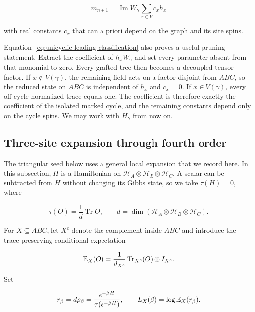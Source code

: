 \begin{equation}
 m_{n+1}=\operatorname{Im}W_\gamma\sum_{x\in V}c_xh_x
 \label{eq:unicyclic-leading-classification}
\end{equation}

with real constants $c_x$ that can a priori depend on the graph and its site
spins.

Equation~\eqref{eq:unicyclic-leading-classification} also proves a useful
pruning statement.  Extract the coefficient of $h_xW_\gamma$ and set every
parameter absent from that monomial to zero.  Every grafted tree then becomes
a decoupled tensor factor.  If $x\notin V(\gamma)$, the remaining field acts
on a factor disjoint from $ABC$, so the reduced state on $ABC$ is independent
of $h_x$ and $c_x=0$.  If $x\in V(\gamma)$, every off-cycle normalized trace
equals one.  The coefficient is therefore exactly the coefficient of the
isolated marked cycle, and the remaining constants depend only on the cycle
spins.  We may work with $H_\gamma$ from now on.

\subsection{Three-site expansion through fourth order}
\label{sec:three-site-expansion}

The triangular seed below uses a general local expansion that we record here.
In this subsection, $H$ is a Hamiltonian on
$\mathcal H_A\otimes\mathcal H_B\otimes\mathcal H_C$.  A scalar can be
subtracted from $H$ without changing its Gibbs state, so we take
$\tau(H)=0$, where

\begin{equation}
 \tau(O)=\frac1d\operatorname{Tr}O,
 \qquad
 d=\dim(\mathcal H_A\otimes\mathcal H_B\otimes\mathcal H_C).
 \label{eq:normalized-trace}
\end{equation}

For $X\subseteq ABC$, let $X^c$ denote the complement inside $ABC$ and
introduce the trace-preserving conditional expectation

\begin{equation}
 \mathbb{E}_X(O)
 =\frac{1}{d_{X^c}}\operatorname{Tr}_{X^c}(O)\otimes I_{X^c}.
 \label{eq:conditional-expectation}
\end{equation}

Set

\begin{equation}
 r_\beta=d\rho_\beta
 =\frac{e^{-\beta H}}{\tau(e^{-\beta H})},
 \qquad
 L_X(\beta)=\log\mathbb{E}_X(r_\beta).
 \label{eq:r-and-L}
\end{equation}

